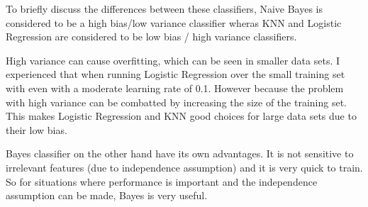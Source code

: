\documentclass[letterpaper, 12pt]{article}
\begin{document}
\begin{itemize}
		To briefly discuss the differences between these classifiers, Naive Bayes is considered to be a high bias/low variance classifier wheras KNN and Logistic Regression are considered to be low bias / high variance classifiers. 

		High variance can cause overfitting, which can be seen in smaller data sets. I experienced that when running Logistic Regression over the small training set with even with a moderate learning rate of 0.1. However because the problem with high variance can be combatted by increasing the size of the training set. This makes Logistic Regression and KNN good choices for large data sets due to their low bias.
		
		Bayes classifier on the other hand have its own advantages. It is not sensitive to irrelevant features (due to independence assumption) and it is very quick to train. So for situations where performance is important and the independence assumption can be made, Bayes is very useful.
\end{itemize}
\end{document}
